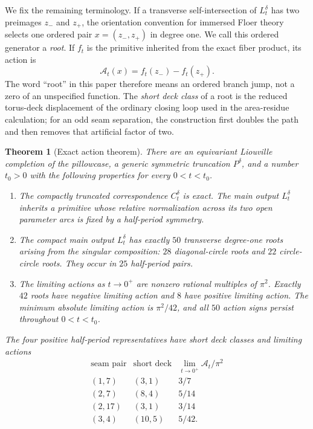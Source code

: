 \documentclass[11pt,reqno]{amsart}
\theoremstyle{plain}
\newtheorem{theorem}{Theorem}[section]
\theoremstyle{definition}
\begin{document}
We fix the remaining terminology.  If a transverse self-intersection of $L_t^\delta$ has two preimages
$z_-$ and $z_+$, the orientation convention for immersed Floer theory selects one ordered pair
$x=(z_-,z_+)$ in degree one.  We call this ordered generator a \emph{root}.  If $f_t$ is the
primitive inherited from the exact fiber product, its action is
\begin{equation}\label{eq:root-action-intro}
 \mathcal A_t(x)=f_t(z_-)-f_t(z_+).
\end{equation}
The word ``root'' in this paper therefore means an ordered branch jump, not a zero of an
unspecified function.  The \emph{short deck class} of a root is the reduced torus-deck
displacement of the ordinary closing loop used in the area-residue calculation; for an odd seam
separation, the construction first doubles the path and then removes that artificial factor of
two.

\begin{theorem}[Exact action theorem]\label{thm:main}
There are an equivariant Liouville completion of the pillowcase, a generic symmetric truncation
$P^\delta$, and a number $t_0>0$ with the following properties for every $0<t<t_0$.
\begin{enumerate}
\item The compactly truncated correspondence $C_t^\delta$ is exact.  The main output $L_t^\delta$ inherits a
primitive whose relative normalization across its two open parameter arcs is fixed by a
half-period symmetry.
\item The compact main output $L_t^\delta$ has exactly $50$ transverse degree-one roots arising from the singular
composition: $28$ diagonal-circle roots and $22$ circle-circle roots.  They occur in $25$
half-period pairs.
\item The limiting actions as $t\to0^+$ are nonzero rational multiples of $\pi^2$.  Exactly $42$
roots have negative limiting action and $8$ have positive limiting action.  The minimum absolute
limiting action is $\pi^2/42$, and all $50$ action signs persist throughout $0<t<t_0$.
\end{enumerate}
The four positive half-period representatives have short deck classes and limiting actions
\[
\begin{array}{c|c|c}
\text{seam pair}&\text{short deck}&\displaystyle\lim_{t\to0^+}\mathcal A_t/\pi^2\\ \hline
(1,7)&(3,1)&3/7\\
(2,7)&(8,4)&5/14\\
(2,17)&(3,1)&3/14\\
(3,4)&(10,5)&5/42.
\end{array}
\]
\end{theorem}
\end{document}
